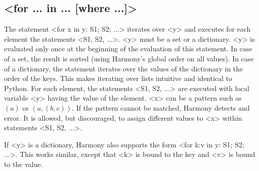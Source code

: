 \documentclass{report}
\begin{document}
\subsection*{<{for ... in ... [where ...]}>}

The statement <{for x in y: S1; S2; ...}>
iterates over <{y}> and executes for each element the statements
<{S1, S2, ...}>.
<{y}> must be a set or a dictionary.  <{y}> is evaluated only once at
the beginning of the evaluation of this statement.  In case of a set,
the result is sorted (using Harmony's global order on all values).
In case of a dictionary, the statement iterates over the values of
the dictionary in the order of the keys.  This makes iterating over
lists intuitive and identical to Python.
For each element, the statements <{S1, S2, ...}> are executed with
local variable <{y}> having the value of the element.
<{x}> can be a pattern such as $(a)$ or $(a, (b, c))$.
If the pattern cannot be matched, Harmony detects and error.
It is allowed, but discouraged, to assign different values to <{x}>
within statements <{S1, S2, ...}>.

If <{y}> is a dictionary, Harmony also supports the form
<{for k:v in y: S1; S2; ...}>.  This works similar,
except that <{k}> is bound to the key and <{v}> is bound to the value.
\end{document}
